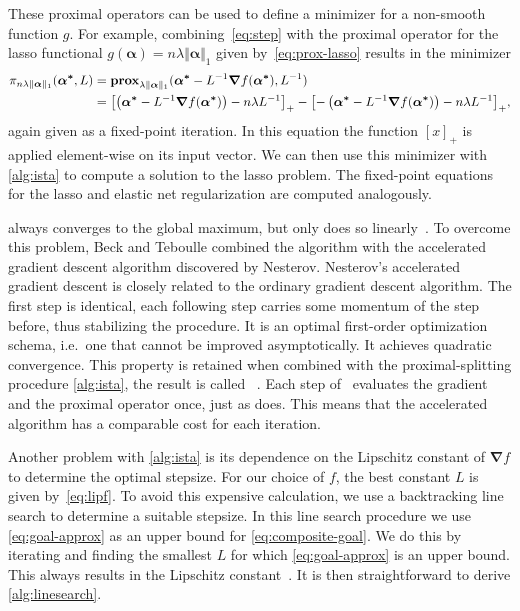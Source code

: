 These proximal operators can be used to define a minimizer for a non-smooth
function \(g\).
For example, combining~\cref{eq:step} with the proximal operator for the
lasso functional \(g(\bm{\alpha}) = n \lambda \Vert \bm{\alpha} \Vert_1\) given by~\cref{eq:prox-lasso} results in
the minimizer
\begin{align*}
  \pi_{n \lambda \Vert \bm{\alpha} \Vert_1}(\bm{\alpha^*} ,L)
  &=  \prox[\(\lambda \Vert \bm{\alpha} \Vert_1\)]{\bm{\alpha^*} - L^{-1} \bm{\nabla} f (\bm{\alpha^*})}{L^{-1}} \\
  &= {\left[ \left(\bm{\alpha^*} - L^{-1} \bm{\nabla} f (\bm{\alpha^*}) \right) - n \lambda L^{-1} \right]}_+ -
    {\left[ -\left(\bm{\alpha^*} - L^{-1} \bm{\nabla} f (\bm{\alpha^*}) \right) - n \lambda L^{-1} \right]}_+,
\end{align*}
again given as a fixed-point iteration.
In this equation the function \( \left[ x \right]_+ \) is applied element-wise on its input vector.
We can then use this minimizer with \cref{alg:ista} to compute a solution to
the lasso problem.
The fixed-point equations for the lasso and elastic net regularization are
computed analogously.

\ista always converges to the global maximum, but only does so linearly~\cite{fista}.
To overcome this problem, Beck and Teboulle combined the \ista algorithm with
the accelerated gradient descent algorithm discovered by Nesterov. 
Nesterov's accelerated gradient descent is closely related to the ordinary
gradient descent algorithm.
The first step is identical, each following step carries some momentum of the
step before, thus stabilizing the procedure.
It is an optimal first-order optimization schema, i.e.~one that cannot be
improved asymptotically.
It achieves quadratic convergence.
This property is retained when combined with the proximal-splitting procedure \cref{alg:ista}, the result is called \fista~\cite{fista}.
Each step of \fista\ evaluates the gradient and the proximal operator once, just as \ista does.
This means that the accelerated algorithm has a comparable cost for each iteration.

Another problem with \cref{alg:ista} is its dependence on the Lipschitz constant of
\(\bm{\nabla} f\) to determine the optimal stepsize.
For our choice of \(f\), the best constant \(L\) is given by~\cref{eq:lipf}.
To avoid this expensive calculation, we use a backtracking line search to
determine a suitable stepsize.
In this line search procedure we use \cref{eq:goal-approx} as an upper bound for \cref{eq:composite-goal}.
We do this by iterating and finding the smallest \(L\) for which
\cref{eq:goal-approx} is an upper bound.
This always results in the Lipschitz constant~\cite{fista}.
It is then straightforward to derive \cref{alg:linesearch}.

